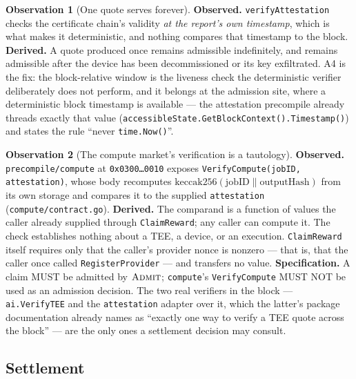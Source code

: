 \documentclass[11pt,a4paper]{article}
\theoremstyle{definition}
\newtheorem{observation}{Observation}[section]
\theoremstyle{remark}
\newcommand{\code}[1]{\texttt{#1}}
\newcommand{\Admit}{\textsc{Admit}}
\begin{document}
\begin{observation}[One quote serves forever]
\label{obs:staleness}
\textbf{Observed.} \code{verifyAttestation} checks the certificate chain's
validity \emph{at the report's own timestamp}, which is what makes it
deterministic, and nothing compares that timestamp to the block. \textbf{Derived.}
A quote produced once remains admissible indefinitely, and remains admissible
after the device has been decommissioned or its key exfiltrated. A4 is the fix:
the block-relative window is the liveness check the deterministic verifier
deliberately does not perform, and it belongs at the admission site, where a
deterministic block timestamp is available --- the attestation precompile
already threads exactly that value
(\code{accessibleState.GetBlockContext().Timestamp()}) and states the rule
``never \code{time.Now()}''.
\end{observation}

\begin{observation}[The compute market's verification is a tautology]
\label{obs:tautology}
\textbf{Observed.} \code{precompile/compute} at
\code{0x0300\ldots0010} exposes \code{VerifyCompute(jobID, attestation)}, whose
body recomputes $\mathrm{keccak256}(\text{jobID} \| \text{outputHash})$ from its
own storage and compares it to the supplied \code{attestation}
(\code{compute/contract.go}). \textbf{Derived.} The comparand is a function of
values the caller already supplied through \code{ClaimReward}; any caller can
compute it. The check establishes nothing about a TEE, a device, or an
execution. \code{ClaimReward} itself requires only that the caller's provider
nonce is nonzero --- that is, that the caller once called
\code{RegisterProvider} --- and transfers no value. \textbf{Specification.} A
claim MUST be admitted by $\Admit$; \code{compute}'s
\code{VerifyCompute} MUST NOT be used as an admission decision. The two real
verifiers in the block --- \code{ai.VerifyTEE} and the
\code{attestation} adapter over it, which the latter's package documentation
already names as ``exactly one way to verify a TEE quote across the block'' ---
are the only ones a settlement decision may consult.
\end{observation}

\subsection{Settlement}
\end{document}
